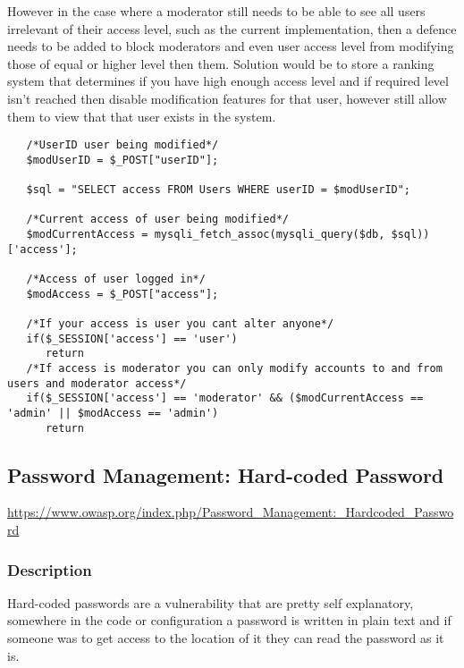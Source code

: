 \documentclass[titlepage]{article}
\begin{document}
      However in the case where a moderator still needs to be able to see all users irrelevant of their access level, such as the current implementation, then a defence needs to be added to block moderators and even user access level from modifying those of equal or higher level then them. Solution would be to store a ranking system that determines if you have high enough access level and if required level isn't reached then disable modification features for that user, however still allow them to view that that user exists in the system.

      \begin{lstlisting}
   /*UserID user being modified*/
   $modUserID = $_POST["userID"];

   $sql = "SELECT access FROM Users WHERE userID = $modUserID";

   /*Current access of user being modified*/
   $modCurrentAccess = mysqli_fetch_assoc(mysqli_query($db, $sql))['access'];
   
   /*Access of user logged in*/
   $modAccess = $_POST["access"];

   /*If your access is user you cant alter anyone*/
   if($_SESSION['access'] == 'user')
      return
   /*If access is moderator you can only modify accounts to and from users and moderator access*/
   if($_SESSION['access'] == 'moderator' && ($modCurrentAccess == 'admin' || $modAccess == 'admin')
      return         

      \end{lstlisting}



   \subsection{Password Management: Hard-coded Password} %
   \label{sub:hardcoded_passwords}

      \url{https://www.owasp.org/index.php/Password_Management:_Hardcoded_Password}
   
      \subsubsection{Description} %
      \label{ssub:hard-coded_passwords_description}

      Hard-coded passwords are a vulnerability that are pretty self explanatory, somewhere in the code or configuration a password is written in plain text and if someone was to get access to the location of it they can read the password as it is.
\end{document}

